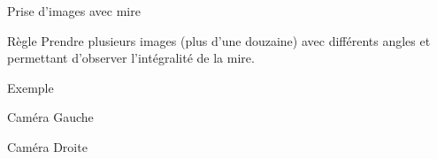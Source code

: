 \documentclass[8pt]{beamer}
\begin{document}
	\begin{frame}{Prise d'images avec mire}\centering
		\begin{block}{Règle}
			Prendre plusieurs images (plus d'une douzaine) avec différents angles et permettant d'observer l'intégralité de la mire.
		\end{block}
		\begin{exampleblock}{Exemple}
			\begin{minipage}[t]{.48\textwidth}\centering
				Caméra Gauche
			\end{minipage}\hfill
			\begin{minipage}[t]{.48\textwidth}\centering
				Caméra Droite
			\end{minipage}\vspace{1em}\\
			\begin{minipage}[c]{.48\textwidth}\centering
			\end{minipage}\hfill
			\begin{minipage}[c]{.48\textwidth}\centering
			\end{minipage}
		\end{exampleblock}
	\end{frame}
\end{document}

